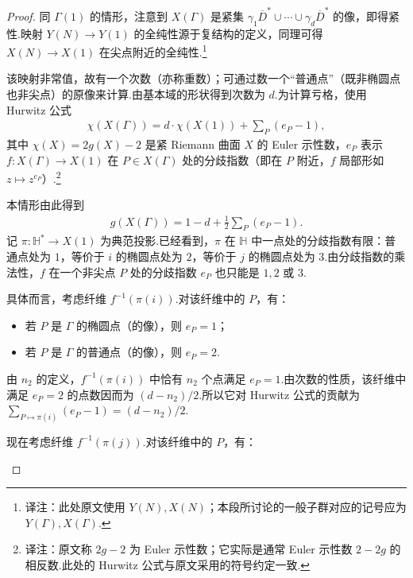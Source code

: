 \begin{proof}

同 $\Gamma(1)$ 的情形，注意到 $X(\Gamma)$ 是紧集 $\gamma_1\overline D^*\cup\cdots\cup\gamma_d\overline D^*$ 的像，即得紧性.映射 $Y(N)\longrightarrow Y(1)$ 的全纯性源于复结构的定义，同理可得 $X(N)\longrightarrow X(1)$ 在尖点附近的全纯性.\footnote{译注：此处原文使用 $Y(N),X(N)$；本段所讨论的一般子群对应的记号应为 $Y(\Gamma),X(\Gamma)$.}

该映射非常值，故有一个次数（亦称重数）；可通过数一个``普通点''（既非椭圆点也非尖点）的原像来计算.由基本域的形状得到次数为 $d$.为计算亏格，使用 Hurwitz 公式
\begin{align*}
\chi(X(\Gamma))=d\cdot\chi(X(1))+\sum_P(e_P-1),
\end{align*}
其中 $\chi(X)=2g(X)-2$ 是紧 Riemann 曲面 $X$ 的 Euler 示性数，$e_P$ 表示 $f:X(\Gamma)\longrightarrow X(1)$ 在 $P\in X(\Gamma)$ 处的分歧指数（即在 $P$ 附近，$f$ 局部形如 $z\mapsto z^{e_P}$）.\footnote{译注：原文称 $2g-2$ 为 Euler 示性数；它实际是通常 Euler 示性数 $2-2g$ 的相反数.此处的 Hurwitz 公式与原文采用的符号约定一致.}

本情形由此得到
\begin{align*}
g(X(\Gamma))=1-d+\tfrac12\sum_P(e_P-1).
\end{align*}
记 $\pi:\mathbb H^*\longrightarrow X(1)$ 为典范投影.已经看到，$\pi$ 在 $\mathbb H$ 中一点处的分歧指数有限：普通点处为 $1$，等价于 $i$ 的椭圆点处为 $2$，等价于 $j$ 的椭圆点处为 $3$.由分歧指数的乘法性，$f$ 在一个非尖点 $P$ 处的分歧指数 $e_P$ 也只能是 $1,2$ 或 $3$.



具体而言，考虑纤维 $f^{-1}(\pi(i))$.对该纤维中的 $P$，有：

\begin{itemize}

\item 若 $P$ 是 $\Gamma$ 的椭圆点（的像），则 $e_P=1$；

\item 若 $P$ 是 $\Gamma$ 的普通点（的像），则 $e_P=2$.

\end{itemize}

由 $n_2$ 的定义，$f^{-1}(\pi(i))$ 中恰有 $n_2$ 个点满足 $e_P=1$.由次数的性质，该纤维中满足 $e_P=2$ 的点数因而为 $(d-n_2)/2$.所以它对 Hurwitz 公式的贡献为 $\sum_{P\mapsto\pi(i)}(e_P-1)=(d-n_2)/2$.



现在考虑纤维 $f^{-1}(\pi(j))$.对该纤维中的 $P$，有：

\begin{itemize}


\end{itemize}
\end{proof}
